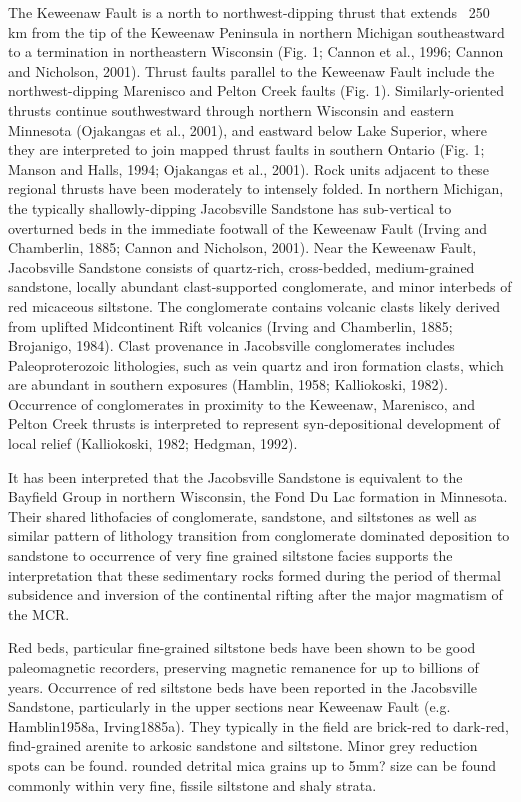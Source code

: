 \documentclass[11pt,letterpaper]{article}
\begin{document}
The Keweenaw Fault is a north to northwest-dipping thrust that extends ~250 km from the tip of the Keweenaw Peninsula in northern Michigan southeastward to a termination in northeastern Wisconsin (Fig. 1; Cannon et al., 1996; Cannon and Nicholson, 2001). Thrust faults parallel to the Keweenaw Fault include the northwest-dipping Marenisco and Pelton Creek faults (Fig. 1). Similarly-oriented thrusts continue southwestward through northern Wisconsin and eastern Minnesota (Ojakangas et al., 2001), and eastward below Lake Superior, where they are interpreted to join mapped thrust faults in southern Ontario (Fig. 1; Manson and Halls, 1994; Ojakangas et al., 2001). Rock units adjacent to these regional thrusts have been moderately to intensely folded. In northern Michigan, the typically shallowly-dipping Jacobsville Sandstone has sub-vertical to overturned beds in the immediate footwall of the Keweenaw Fault (Irving and Chamberlin, 1885; Cannon and Nicholson, 2001). Near the Keweenaw Fault, Jacobsville Sandstone consists of quartz-rich, cross-bedded, medium-grained sandstone, locally abundant clast-supported conglomerate, and minor interbeds of red micaceous siltstone. The conglomerate contains volcanic clasts likely derived from uplifted Midcontinent Rift volcanics (Irving and Chamberlin, 1885; Brojanigo, 1984). Clast provenance in Jacobsville conglomerates includes Paleoproterozoic lithologies, such as vein quartz and iron formation clasts, which are abundant in southern exposures (Hamblin, 1958; Kalliokoski, 1982). Occurrence of conglomerates in proximity to the Keweenaw, Marenisco, and Pelton Creek thrusts is interpreted to represent syn-depositional development of local relief (Kalliokoski, 1982; Hedgman, 1992). 

It has been interpreted that the Jacobsville Sandstone is equivalent to the Bayfield Group in northern Wisconsin, the Fond Du Lac formation in Minnesota. Their shared lithofacies of conglomerate, sandstone, and siltstones as well as similar pattern of lithology transition from conglomerate dominated deposition to sandstone to occurrence of very fine grained siltstone facies  supports the interpretation that these sedimentary rocks formed during the period of thermal subsidence and inversion of the continental rifting after the major magmatism of the MCR. 

Red beds, particular fine-grained siltstone beds have been shown to be good paleomagnetic recorders, preserving magnetic remanence for up to billions of years. Occurrence of red siltstone beds have been reported in the Jacobsville Sandstone, particularly in the upper sections near Keweenaw Fault (e.g. Hamblin1958a, Irving1885a). They typically in the field are brick-red to dark-red, find-grained arenite to arkosic sandstone and siltstone. Minor grey reduction spots can be found. rounded detrital mica grains up to 5mm? size can be found commonly within very fine, fissile siltstone and shaly strata. 
\end{document}

